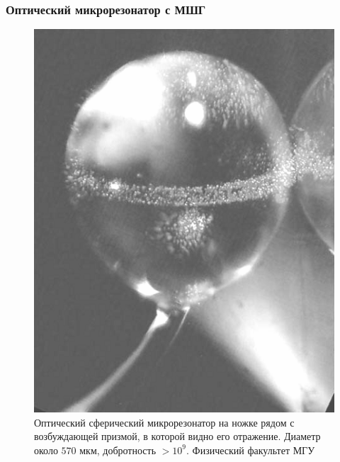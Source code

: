 \documentclass[compress]{beamer}
\begin{document}
    \begin{frame}\frametitle{Оптический микрорезонатор с МШГ}

        \begin{figure}[h]
            \centering
            \includegraphics[width=\textwidth,height=0.6\textheight,keepaspectratio]{spherical_resonator}
            \caption[]{Оптический сферический микрорезонатор на ножке рядом с возбуждающей призмой, в которой видно его отражение. Диаметр около $570$ мкм, добротность $> 10^9$. Физический факультет МГУ \cite{microresonators}}
            \label{fig:spherical_resonator}
        \end{figure}

    \end{frame}

\end{document}
